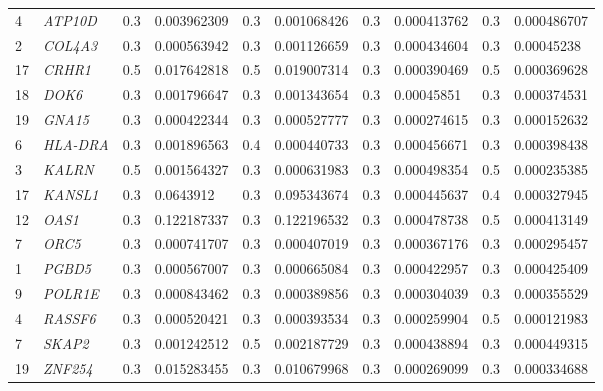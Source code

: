 \begin{refsection}
\begin{otherlanguage}{english}
\begin{scriptsize}
\begin{longtable}{llllllllll}
4 & \cellcolor[HTML]{FE996B}\textit{ATP10D} & 0.3 & 0.003962309 & 0.3 & 0.001068426 & 0.3 & 0.000413762 & 0.3 & 0.000486707 \\
2 & \cellcolor[HTML]{FE996B}\textit{COL4A3} & 0.3 & 0.000563942 & 0.3 & 0.001126659 & 0.3 & 0.000434604 & 0.3 & 0.00045238 \\
17 & \cellcolor[HTML]{FE996B}\textit{CRHR1} & 0.5 & 0.017642818 & 0.5 & 0.019007314 & 0.3 & 0.000390469 & 0.5 & 0.000369628 \\
18 & \cellcolor[HTML]{FE996B}\textit{DOK6} & 0.3 & 0.001796647 & 0.3 & 0.001343654 & 0.3 & 0.00045851 & 0.3 & 0.000374531 \\
19 & \cellcolor[HTML]{FE996B}\textit{GNA15} & 0.3 & \cellcolor[HTML]{FE996B}0.000422344 & 0.3 & 0.000527777 & 0.3 & 0.000274615 & 0.3 & 0.000152632 \\
6 & \cellcolor[HTML]{FE996B}\textit{HLA-DRA} & 0.3 & 0.001896563 & 0.4 & \cellcolor[HTML]{FE996B}0.000440733 & 0.3 & 0.000456671 & 0.3 & 0.000398438 \\
3 & \cellcolor[HTML]{FE996B}\textit{KALRN} & 0.5 & 0.001564327 & 0.3 & 0.000631983 & 0.3 & 0.000498354 & 0.5 & 0.000235385 \\
17 & \cellcolor[HTML]{FE996B}\textit{KANSL1} & 0.3 & 0.0643912 & 0.3 & 0.095343674 & 0.3 & 0.000445637 & 0.4 & 0.000327945 \\
12 & \cellcolor[HTML]{FE996B}\textit{OAS1} & 0.3 & 0.122187337 & 0.3 & 0.122196532 & 0.3 & 0.000478738 & 0.5 & 0.000413149 \\
7 & \cellcolor[HTML]{FE996B}\textit{ORC5} & 0.3 & 0.000741707 & 0.3 & \cellcolor[HTML]{FE996B}0.000407019 & 0.3 & 0.000367176 & 0.3 & 0.000295457 \\
1 & \cellcolor[HTML]{FE996B}\textit{PGBD5} & 0.3 & 0.000567007 & 0.3 & 0.000665084 & 0.3 & 0.000422957 & 0.3 & 0.000425409 \\
9 & \cellcolor[HTML]{FE996B}\textit{POLR1E} & 0.3 & 0.000843462 & 0.3 & \cellcolor[HTML]{FE996B}0.000389856 & 0.3 & 0.000304039 & 0.3 & 0.000355529 \\
4 & \cellcolor[HTML]{FE996B}\textit{RASSF6} & 0.3 & 0.000520421 & 0.3 & \cellcolor[HTML]{FE996B}0.000393534 & 0.3 & 0.000259904 & 0.5 & 0.000121983 \\
7 & \cellcolor[HTML]{FE996B}\textit{SKAP2} & 0.3 & 0.001242512 & 0.5 & 0.002187729 & 0.3 & 0.000438894 & 0.3 & 0.000449315 \\
19 & \cellcolor[HTML]{FE996B}\textit{ZNF254} & 0.3 & 0.015283455 & 0.3 & 0.010679968 & 0.3 & 0.000269099 & 0.3 & 0.000334688 \\

\end{longtable}
\end{scriptsize}
\end{otherlanguage}
\end{refsection}
